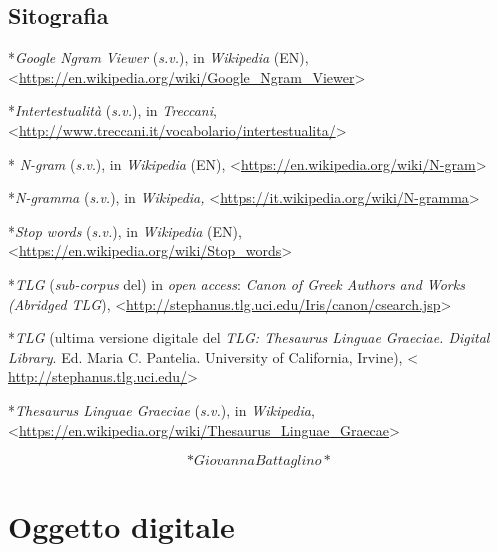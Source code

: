 \documentclass[
  b5paper,
  twoside,
  11pt,
  chapterprefix=false,
  bibliography=totocnumbered,
  listof=flat]{scrbook}
\begin{document}
\hypertarget{sitografia-20}{%
\section*{Sitografia}\label{sitografia-20}}

*\emph{Google Ngram Viewer} (\emph{s.v.}), in \emph{Wikipedia} (EN),
\textless{}\href{https://en.wikipedia.org/wiki/Google_Ngram_Viewer}{{https://en.wikipedia.org/wiki/Google\_Ngram\_Viewer}}\textgreater{}

*\emph{Intertestualità} (\emph{s.v.}), in \emph{Treccani},
\textless{}\href{http://www.treccani.it/vocabolario/intertestualita/}{{http://www.treccani.it/vocabolario/intertestualita/}}\textgreater{}

* \emph{N-gram} (\emph{s.v}.), in \emph{Wikipedia} (EN),
\textless{}\href{https://en.wikipedia.org/wiki/N-gram}{{https://en.wikipedia.org/wiki/N-gram}}\textgreater{}

*\emph{N-gramma} (\emph{s.v.}), in \emph{Wikipedia,}
\textless{}\href{https://it.wikipedia.org/wiki/N-gramma}{{https://it.wikipedia.org/wiki/N-gramma}}\textgreater{}

*\emph{Stop words} (\emph{s.v.}), in \emph{Wikipedia} (EN),
\textless{}\href{https://en.wikipedia.org/wiki/Stop_words}{{https://en.wikipedia.org/wiki/Stop\_words}}\textgreater{}

*\emph{TLG} (\emph{sub-corpus} del) in \emph{open access}: \emph{Canon of Greek Authors and
Works (Abridged TLG}),
\textless{}\href{http://stephanus.tlg.uci.edu/Iris/canon/csearch.jsp}{{http://stephanus.tlg.uci.edu/Iris/canon/csearch.jsp}}\textgreater{}

*\emph{TLG} (ultima versione digitale del \emph{TLG: Thesaurus Linguae Graeciae.
Digital Library}. Ed. Maria C. Pantelia. University of California,
Irvine), \textless{}
\href{http://stephanus.tlg.uci.edu/}{{http://stephanus.tlg.uci.edu/}}\textgreater{}

*\emph{Thesaurus Linguae Graeciae} (\emph{s.v.}), in \emph{Wikipedia},
\textless{}\href{https://en.wikipedia.org/wiki/Thesaurus_Linguae_Graecae}{{https://en.wikipedia.org/wiki/Thesaurus\_Linguae\_Graecae}}\textgreater{}

\[*Giovanna Battaglino*\]

\hypertarget{oggetto-digitale}{%
\chapter{Oggetto digitale}\label{oggetto-digitale}}
\end{document}
